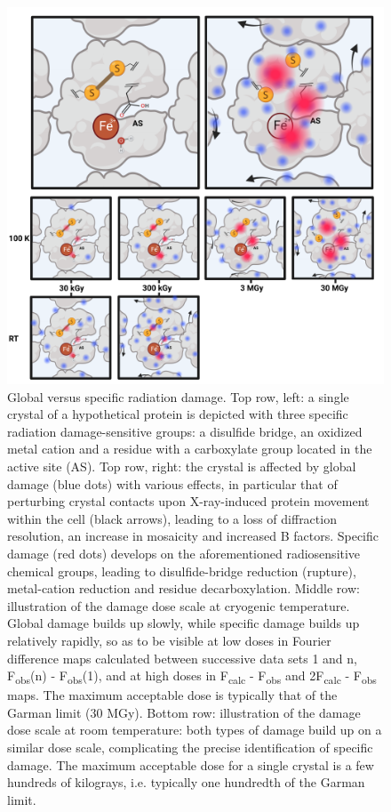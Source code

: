 \begin{figure}[H] %
    \centering
    \noindent \includegraphics[width=\textwidth]{images/Introduction/Figure3.pdf}
    \hfill
    \caption{Global versus specific radiation damage. Top row, left: a single crystal of a hypothetical protein is depicted with three specific radiation damage-sensitive groups: a disulfide bridge, an oxidized metal cation and a residue with a carboxylate group located in the active site (AS). Top row, right: the crystal is affected by global damage (blue dots) with various effects, in particular that of perturbing crystal contacts upon X-ray-induced protein movement within the cell (black arrows), leading to a loss of diffraction resolution, an increase in mosaicity and increased B factors. Specific damage (red dots) develops on the aforementioned radiosensitive chemical groups, leading to disulfide-bridge reduction (rupture), metal-cation reduction and residue decarboxylation. Middle row: illustration of the damage dose scale at cryogenic temperature. Global damage builds up slowly, while specific damage builds up relatively rapidly, so as to be visible at low doses in Fourier difference maps calculated between successive data sets 1 and n, F\textsubscript{obs}(n) - F\textsubscript{obs}(1), and at high doses in F\textsubscript{calc} - F\textsubscript{obs} and 2F\textsubscript{calc} - F\textsubscript{obs} maps. The maximum acceptable dose is typically that of the Garman limit (30 MGy). Bottom row: illustration of the damage dose scale at room temperature: both types of damage build up on a similar dose scale, complicating the precise identification of specific damage. The maximum acceptable dose for a single crystal is a few hundreds of kilograys, i.e. typically one hundredth of the Garman limit.}
    \label{fig:Figure3}
\end{figure}

